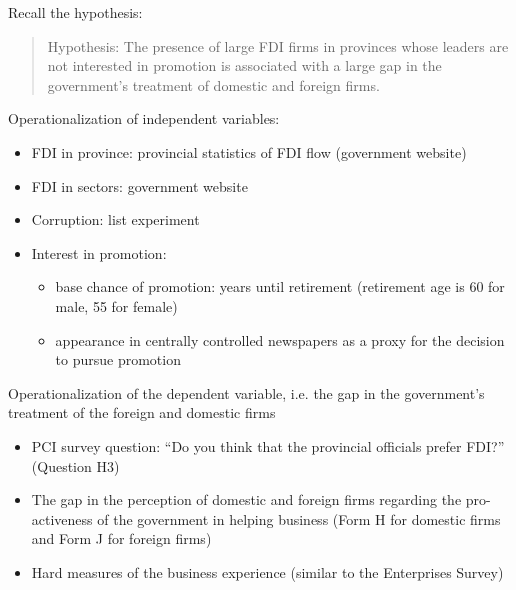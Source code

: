 Recall the hypothesis:

\begin{quote}
Hypothesis: The presence of large FDI firms in provinces whose leaders are not interested in promotion is associated with a large gap in the government's treatment of domestic and foreign firms.
\end{quote}

Operationalization of independent variables:
\begin{itemize}
\item FDI in province: provincial statistics of FDI flow (government website)
\item FDI in sectors: government website
\item Corruption: list experiment \citep{Malesky2015}
\item Interest in promotion: 
\begin{itemize}
	\item base chance of promotion: years until retirement (retirement age is 60 for male, 55 for female)
	\item appearance in centrally controlled newspapers as a proxy for the decision to pursue promotion
\end{itemize}
\end{itemize}

Operationalization of the dependent variable, i.e. the gap in the government's treatment of the foreign and domestic firms
\begin{itemize}
	\item PCI survey question: ``Do you think that the provincial officials prefer FDI?'' (Question H3)
	\item The gap in the perception of domestic and foreign firms regarding the pro-activeness of the government in helping business (Form H for domestic firms and Form J for foreign firms)
	\item Hard measures of the business experience (similar to the Enterprises Survey)
\end{itemize}


